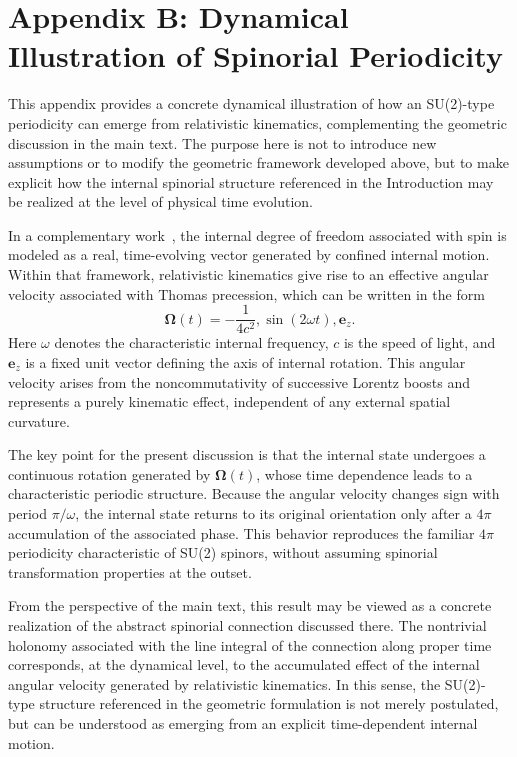 \documentclass[%
 reprint,
 amsmath,amssymb,
 aps,
 prb,
]{revtex4-2}
\numberwithin{equation}{section}
\begin{document}
\appendix
\section{Appendix B: Dynamical Illustration of Spinorial Periodicity}
\label{app:spin_dynamics}

This appendix provides a concrete dynamical illustration of how an SU(2)-type periodicity can emerge from relativistic kinematics, complementing the geometric discussion in the main text. The purpose here is not to introduce new assumptions or to modify the geometric framework developed above, but to make explicit how the internal spinorial structure referenced in the Introduction may be realized at the level of physical time evolution.

In a complementary work~\cite{hanamura17765238}, the internal degree of freedom associated with spin is modeled as a real, time-evolving vector generated by confined internal motion. Within that framework, relativistic kinematics give rise to an effective angular velocity associated with Thomas precession, which can be written in the form
\begin{equation}
\boldsymbol{\Omega}(t) = -\frac{1}{4c^2},\sin(2\omega t),\mathbf e_z.
\end{equation}
Here $\omega$ denotes the characteristic internal frequency, $c$ is the speed of light, and $\mathbf e_z$ is a fixed unit vector defining the axis of internal rotation. This angular velocity arises from the noncommutativity of successive Lorentz boosts and represents a purely kinematic effect, independent of any external spatial curvature.

The key point for the present discussion is that the internal state undergoes a continuous rotation generated by $\boldsymbol{\Omega}(t)$, whose time dependence leads to a characteristic periodic structure. Because the angular velocity changes sign with period $\pi/\omega$, the internal state returns to its original orientation only after a $4\pi$ accumulation of the associated phase. This behavior reproduces the familiar $4\pi$ periodicity characteristic of SU(2) spinors, without assuming spinorial transformation properties at the outset.

From the perspective of the main text, this result may be viewed as a concrete realization of the abstract spinorial connection discussed there. The nontrivial holonomy associated with the line integral of the connection along proper time corresponds, at the dynamical level, to the accumulated effect of the internal angular velocity generated by relativistic kinematics. In this sense, the SU(2)-type structure referenced in the geometric formulation is not merely postulated, but can be understood as emerging from an explicit time-dependent internal motion.
\end{document}
